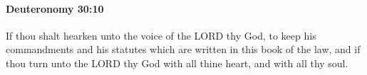 
		\paragraph{Deuteronomy 30:10} %
			\label{DEUTERONOMY-30-10}

			If thou shalt hearken unto the voice of the LORD thy God, to keep his commandments and his statutes which are written in this book of the law, and if thou turn unto the LORD thy God with all thine heart, and with all thy soul.


